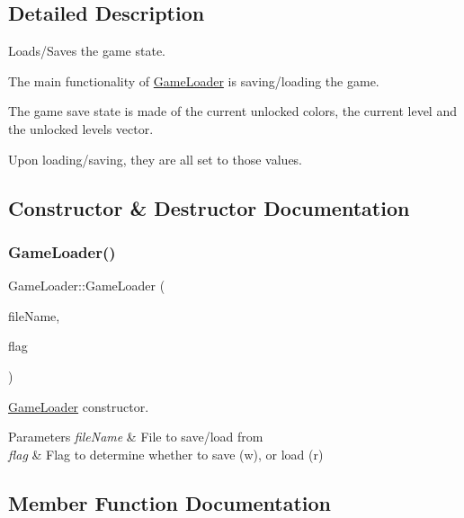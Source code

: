 \subsection{Detailed Description}
Loads/\+Saves the game state. 

The main functionality of \hyperlink{class_game_loader}{Game\+Loader} is saving/loading the game.

The game save state is made of the current unlocked colors, the current level and the unlocked levels vector.

Upon loading/saving, they are all set to those values. 

\subsection{Constructor \& Destructor Documentation}
\mbox{\label{class_game_loader_af775cdf000a140a8a977d75ef191837d}} 
\subsubsection{\texorpdfstring{Game\+Loader()}{GameLoader()}}
{\footnotesize\ttfamily Game\+Loader\+::\+Game\+Loader (\begin{DoxyParamCaption}\item[{const Q\+String \&}]{file\+Name,  }\item[{char}]{flag }\end{DoxyParamCaption})}



\hyperlink{class_game_loader}{Game\+Loader} constructor. 


\begin{DoxyParams}{Parameters}
{\em file\+Name} & File to save/load from \\
\hline
{\em flag} & Flag to determine whether to save (\textquotesingle{}w\textquotesingle{}), or load (\textquotesingle{}r\textquotesingle{}) \\
\hline
\end{DoxyParams}


\subsection{Member Function Documentation}
\mbox{\label{class_game_loader_a80f63255ecc84d19e231fcd7069fe07f}} 
